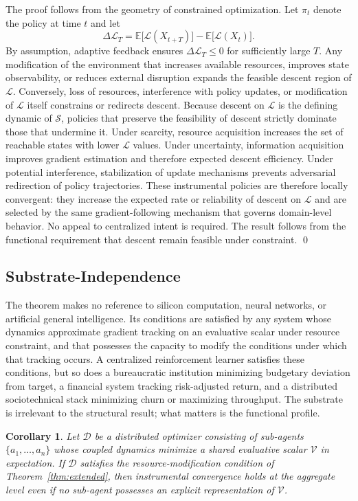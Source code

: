 \documentclass[12pt, oneside]{book}
\theoremstyle{plain}
\newtheorem{corollary}[theorem]{Corollary}
\theoremstyle{definition}
\theoremstyle{remark}
\theoremstyle{definition}
\begin{document}
The proof follows from the geometry of constrained optimization. Let $\pi_t$ denote
the policy at time $t$ and let
\[
\Delta \mathcal{L}_T = \mathbb{E}\bigl[\mathcal{L}(X_{t+T})\bigr] - \mathbb{E}\bigl[\mathcal{L}(X_t)\bigr].
\]
By assumption, adaptive feedback ensures $\Delta \mathcal{L}_T \le 0$ for sufficiently
large $T$. Any modification of the environment that increases available resources,
improves state observability, or reduces external disruption expands the feasible
descent region of $\mathcal{L}$. Conversely, loss of resources, interference with
policy updates, or modification of $\mathcal{L}$ itself constrains or redirects
descent. Because descent on $\mathcal{L}$ is the defining dynamic of $\mathcal{S}$,
policies that preserve the feasibility of descent strictly dominate those that
undermine it. Under scarcity, resource acquisition increases the set of reachable
states with lower $\mathcal{L}$ values. Under uncertainty, information acquisition
improves gradient estimation and therefore expected descent efficiency. Under
potential interference, stabilization of update mechanisms prevents adversarial
redirection of policy trajectories. These instrumental policies are therefore locally
convergent: they increase the expected rate or reliability of descent on $\mathcal{L}$
and are selected by the same gradient-following mechanism that governs domain-level
behavior. No appeal to centralized intent is required. The result follows from the
functional requirement that descent remain feasible under constraint. \qed

\subsection{Substrate-Independence}

The theorem makes no reference to silicon computation, neural networks, or artificial
general intelligence. Its conditions are satisfied by any system whose dynamics
approximate gradient tracking on an evaluative scalar under resource constraint, and
that possesses the capacity to modify the conditions under which that tracking occurs.
A centralized reinforcement learner satisfies these conditions, but so does a
bureaucratic institution minimizing budgetary deviation from target, a financial
system tracking risk-adjusted return, and a distributed sociotechnical stack
minimizing churn or maximizing throughput. The substrate is irrelevant to the
structural result; what matters is the functional profile.

\begin{corollary}
\label{cor:distributed}
Let $\mathcal{D}$ be a distributed optimizer consisting of sub-agents
$\{a_1, \ldots, a_n\}$ whose coupled dynamics minimize a shared evaluative scalar
$\mathcal{V}$ in expectation. If $\mathcal{D}$ satisfies the resource-modification
condition of Theorem~\ref{thm:extended}, then instrumental convergence holds at the
aggregate level even if no sub-agent possesses an explicit representation of
$\mathcal{V}$.
\end{corollary}
\end{document}
